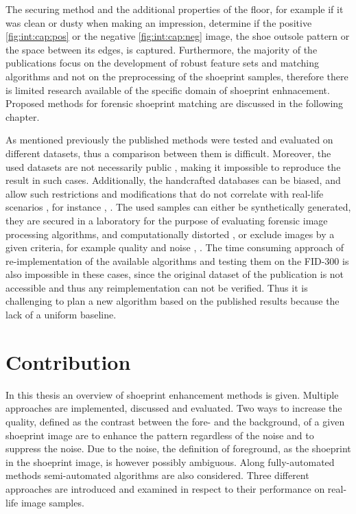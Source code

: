 \documentclass[draft,final]{vutinfth} %
\begin{document}
The securing method and the additional properties of the floor, for example if it was clean or dusty when making an impression, determine if the positive \ref{fig:int:cap:pos} or the negative \ref{fig:int:cap:neg} image, the shoe outsole pattern or the space between its edges, is captured.
Furthermore, the majority of the publications focus on the development of robust feature sets and matching algorithms and not on the preprocessing of the shoeprint samples, therefore there  is limited research available of the specific domain of shoeprint enhnacement.
Proposed methods for forensic shoeprint matching are discussed in the following chapter.
\par
As mentioned previously the published methods were tested and evaluated on different datasets, thus a comparison between them is difficult.
Moreover, the used datasets are not necessarily public \cite{katireddy2017novel}, \cite{dardi2009texture} making it impossible to reproduce the result in such cases.
Additionally, the handcrafted databases can be biased, and allow such restrictions and modifications that do not correlate with real-life scenarios \cite{rida2019forensic}, for instance \cite{dardi2009texture}, \cite{tang2010footwear}.
The used samples can either be synthetically generated, they are secured in a laboratory for the purpose of evaluating forensic image processing algorithms, and computationally distorted \cite{de2005automated}, \cite{gueham2008automatic} or exclude images by a given criteria, for example quality and noise \cite{dardi2009texture}, \cite{tang2010footwear}.
The time consuming approach of re-implementation of the available algorithms and testing them on the FID-300 is also impossible in these cases, since the original dataset of the publication is not accessible and thus any reimplementation can not be verified.
Thus it is challenging to plan a new algorithm based on the published results because the lack of a uniform baseline.

\section{Contribution}
\par
In this thesis an overview of shoeprint enhancement methods is given.
Multiple approaches are implemented, discussed and evaluated.
Two ways to increase the quality, defined as the contrast between the fore- and the background, of a given shoeprint image are to enhance the pattern regardless of the noise and to suppress the noise.
Due to the noise, the definition of foreground, as the shoeprint in the shoeprint image, is however possibly ambiguous.
Along fully-automated methods semi-automated algorithms are also considered.
Three different approaches are introduced and examined in respect to their performance on real-life image samples.
\end{document}
